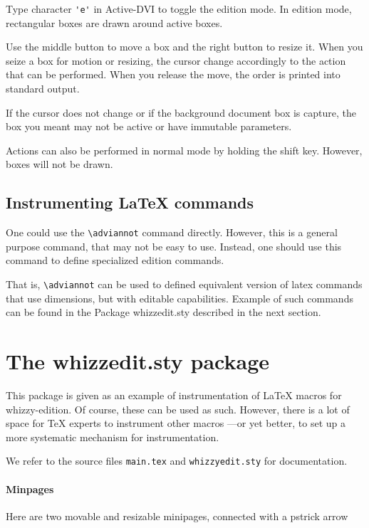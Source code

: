 \documentclass[12pt]{article}
\def \ActiveDVI {Active-DVI}
\begin{document}
Type character \verb"'e'" in {\ActiveDVI} to toggle the edition mode. 
In edition mode, rectangular boxes are drawn around active boxes.

Use the middle button to move a box and the right button to resize it.  When
you seize a box for motion or resizing, the cursor change accordingly to the
action that can be performed. When you release the move, the order is
printed into standard output.

If the cursor does not change or if the background document box is capture,
the box you meant may not be active or have immutable parameters.

Actions can also be performed in normal mode by holding the shift key. 
However, boxes will not be drawn.

\subsection {Instrumenting {\LaTeX} commands}

One could use the \verb"\adviannot" command directly. 
However, this is a general purpose command, that may not be easy to 
use. Instead, one should use this command to define specialized edition
commands. 

That is, \verb"\adviannot" can be used to defined equivalent version of
latex commands that use dimensions, but with editable capabilities.  Example
of such commands can be found in the Package whizzedit.sty described in the
next section.


\section {The whizzedit.sty package}

This package is given as an example of instrumentation of {\LaTeX} macros
for whizzy-edition. Of course, these can be used as such. However, there is
a lot of space for {\TeX} experts to instrument other macros ---or yet
better, to set up a more systematic mechanism for instrumentation.

We refer to the source files {\tt main.tex} and {\tt whizzyedit.sty} for
documentation.

\paragraph {Minpages}

Here are two movable and resizable minipages, connected with 
a pstrick arrow
\end{document}
